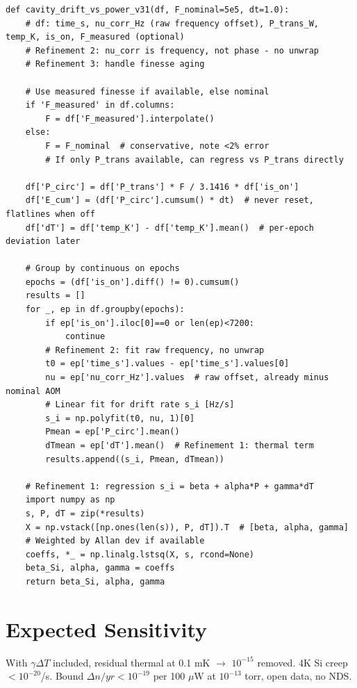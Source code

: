 \documentclass[11pt,a4paper]{article}
\begin{document}
\begin{lstlisting}
def cavity_drift_vs_power_v31(df, F_nominal=5e5, dt=1.0):
    # df: time_s, nu_corr_Hz (raw frequency offset), P_trans_W, temp_K, is_on, F_measured (optional)
    # Refinement 2: nu_corr is frequency, not phase - no unwrap
    # Refinement 3: handle finesse aging
    
    # Use measured finesse if available, else nominal
    if 'F_measured' in df.columns:
        F = df['F_measured'].interpolate()
    else:
        F = F_nominal  # conservative, note <2% error
        # If only P_trans available, can regress vs P_trans directly
        
    df['P_circ'] = df['P_trans'] * F / 3.1416 * df['is_on']
    df['E_cum'] = (df['P_circ'].cumsum() * dt)  # never reset, flatlines when off
    df['dT'] = df['temp_K'] - df['temp_K'].mean()  # per-epoch deviation later
    
    # Group by continuous on epochs
    epochs = (df['is_on'].diff() != 0).cumsum()
    results = []
    for _, ep in df.groupby(epochs):
        if ep['is_on'].iloc[0]==0 or len(ep)<7200:
            continue
        # Refinement 2: fit raw frequency, no unwrap
        t0 = ep['time_s'].values - ep['time_s'].values[0]
        nu = ep['nu_corr_Hz'].values  # raw offset, already minus nominal AOM
        # Linear fit for drift rate s_i [Hz/s]
        s_i = np.polyfit(t0, nu, 1)[0]
        Pmean = ep['P_circ'].mean()
        dTmean = ep['dT'].mean()  # Refinement 1: thermal term
        results.append((s_i, Pmean, dTmean))
    
    # Refinement 1: regression s_i = beta + alpha*P + gamma*dT
    import numpy as np
    s, P, dT = zip(*results)
    X = np.vstack([np.ones(len(s)), P, dT]).T  # [beta, alpha, gamma]
    # Weighted by Allan dev if available
    coeffs, *_ = np.linalg.lstsq(X, s, rcond=None)
    beta_Si, alpha, gamma = coeffs
    return beta_Si, alpha, gamma
\end{lstlisting}

\section{Expected Sensitivity}
With $\gamma\Delta T$ included, residual thermal at 0.1 mK $\rightarrow$ $10^{-15}$ removed. 4K Si creep $<10^{-20}$/s. Bound $\Delta n/yr <10^{-19}$ per 100 $\mu$W at $10^{-13}$ torr, open data, no NDS.
\end{document}
